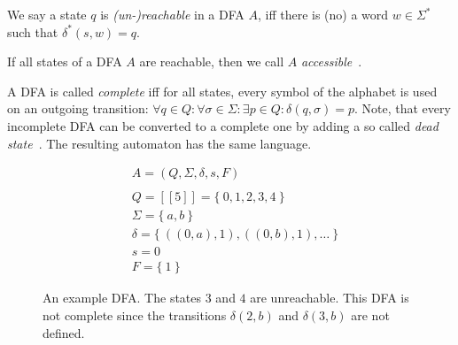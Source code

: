 \begin{definition}\label{ch:2:unreachable-states}
	We say a state $q$ is \emph{(un-)reachable} in a DFA $A$, iff there is (no) a word $w \in \Sigma^*$ such that $\delta^*(s, w) = q$.
\end{definition}
\noindent If all states of a DFA $A$ are reachable, then we call $A$ \emph{accessible}~\cite[p. 2]{CP05}.

A DFA is called \emph{complete} iff for all states, every symbol of the alphabet is used on an outgoing transition: $\forall q\in Q\colon \forall\sigma\in\Sigma\colon \exists p\in Q\colon \delta(q,\sigma) = p$. Note, that every incomplete DFA can be converted to a complete one by adding a so called \emph{dead state}~\cite[p. 67]{HMU01}. The resulting automaton has the same language.

\begin{figure}[H]
	\begin{subfigure}{.5\textwidth}\centering{}\end{subfigure}
	\hfill
	\begin{subfigure}{.4\textwidth}
		\begin{align*}
			&A = (Q, \Sigma, \delta, s ,F) \\
			&\\
			&Q = [[5]] = \{\ 0,1,2,3,4\ \} \\
			&\Sigma = \{\ a,b\ \} \\
			&\delta = \{\ ((0,a),1), ((0,b),1), \ldots\ \} \\
			&s = 0 \\
			&F = \{\ 1\ \}
		\end{align*}
	\end{subfigure}
	\caption{An example DFA. The states $3$ and $4$ are unreachable. This DFA is not complete since the transitions $\delta(2,b)$ and $\delta(3,b)$ are not defined.}
	\label{fig:dfa}
\end{figure}


